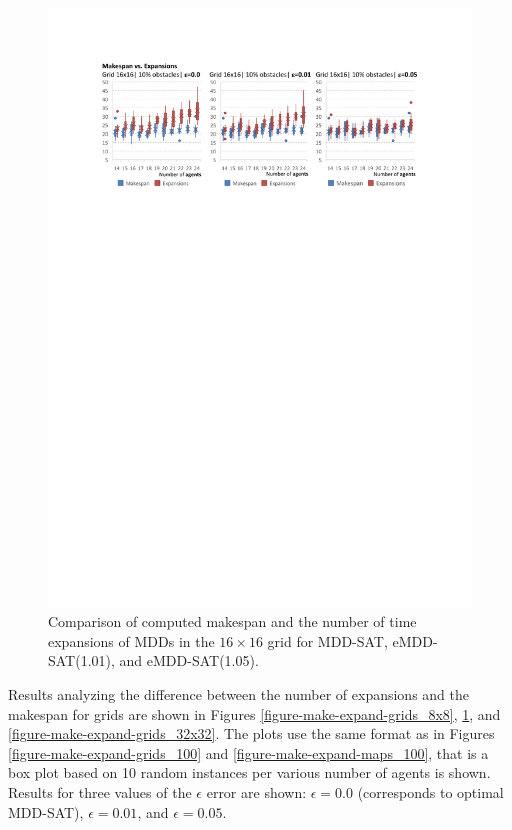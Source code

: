 \documentclass[jair,oneside,11pt]{article}
\begin{document}
\begin{figure}[h]
\centering
\includegraphics[trim={2.5cm 20.8cm 2.5cm 2.5cm},clip,width=1.0\textwidth]{expr_grids-make-expand_16x16.pdf}
\vspace{-0.6cm}\caption{Comparison of computed makespan and the number of time expansions of MDDs in the $16{}\times{}16$ grid for MDD-SAT, eMDD-SAT(1.01), and eMDD-SAT(1.05).}
\label{figure-make-expand-grids_16x16}
\end{figure}

Results analyzing the difference between the number of expansions and the makespan for grids are shown in Figures \ref{figure-make-expand-grids_8x8}, \ref{figure-make-expand-grids_16x16}, and \ref{figure-make-expand-grids_32x32}. The plots use the same format as in Figures \ref{figure-make-expand-grids_100} and \ref{figure-make-expand-maps_100}, that is a box plot based on 10 random instances per various number of agents is shown. Results for three values of the $\epsilon$ error are shown: $\epsilon=0.0$ (corresponds to optimal MDD-SAT), $\epsilon=0.01$, and $\epsilon=0.05$.
\end{document}
